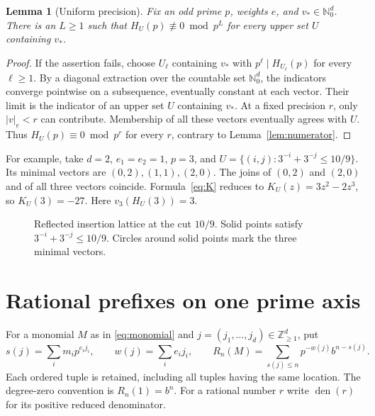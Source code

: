 \documentclass[11pt]{article}
\newtheorem{lemma}[theorem]{Lemma}
\newcommand{\Z}{\mathbb Z}
\newcommand{\N}{\mathbb N_0}
\DeclareMathOperator{\den}{den}
\begin{document}
\begin{lemma}[Uniform precision]\label{lem:compact}
Fix an odd prime $p$, weights $e$, and $v_*\in\N^d$.
There is an $L\ge1$ such that $H_U(p)\not\equiv0\bmod p^L$
for every upper set $U$ containing $v_*$.
\end{lemma}
\begin{proof}
If the assertion fails, choose $U_\ell$ containing $v_*$ with $p^\ell\mid H_{U_\ell}(p)$
for every $\ell\ge1$. By a diagonal extraction over the countable set $\N^d$,
the indicators converge pointwise on a subsequence, eventually constant at each vector.
Their limit is the indicator of an upper set $U$ containing $v_*$. At a fixed precision $r$,
only $|v|_e<r$ can contribute. Membership of all these vectors eventually agrees with $U$.
Thus $H_U(p)\equiv0\bmod p^r$ for every $r$, contrary to Lemma~\ref{lem:numerator}.
\end{proof}

For example, take $d=2$, $e_1=e_2=1$, $p=3$, and
$U=\{(i,j):3^{-i}+3^{-j}\le10/9\}$. Its minimal vectors are $(0,2),(1,1),(2,0)$.
The joins of $(0,2)$ and $(2,0)$ and of all three vectors coincide. Formula~\eqref{eq:K}
reduces to $K_U(z)=3z^2-2z^3$, so $K_U(3)=-27$.
Here $v_3(H_U(3))=3$.

\begin{figure}[ht]
\centering
\caption{Reflected insertion lattice at the cut $10/9$.
Solid points satisfy $3^{-i}+3^{-j}\le10/9$. Circles around solid points mark the three minimal vectors.}
\label{fig:lattice}
\end{figure}

\section{Rational prefixes on one prime axis}

For a monomial $M$ as in \eqref{eq:monomial} and
$j=(j_1,\ldots,j_d)\in\Z_{\ge1}^d$, put
\[
 s(j)=\sum_i m_i p^{e_i j_i},\qquad w(j)=\sum_i e_i j_i,\qquad
 R_n(M)=\sum_{s(j)\le n}p^{-w(j)} b^{n-s(j)} .
\]
Each ordered tuple is retained, including all tuples having the same location.
The degree-zero convention is $R_n(1)=b^n$.
For a rational number $r$ write $\den(r)$ for its positive reduced denominator.
\end{document}
